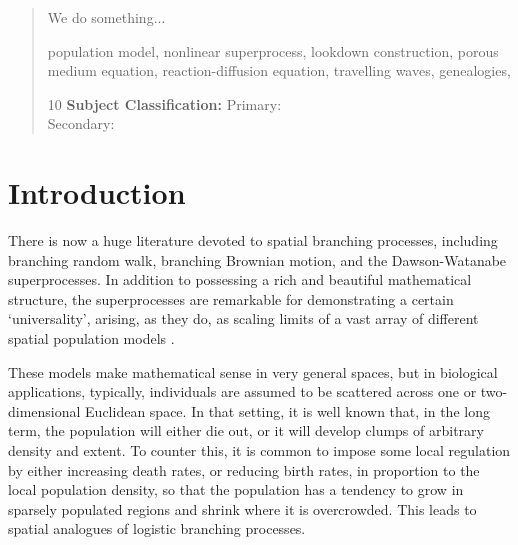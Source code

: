 \documentclass[12pt]{article}
\begin{document}
\date{\today}
\maketitle


\begin{abstract}

We do something...

\vspace{.1in}


  population model, nonlinear superprocess, 
lookdown construction, porous medium equation, 
reaction-diffusion equation, travelling waves, genealogies,


\vspace{.1in}



10 {\bf Subject Classification:}  Primary:  
\\Secondary:   %
 
\end{abstract}
\tableofcontents
\newpage



\section{Introduction}


There is now a huge literature devoted to spatial branching processes,
including branching random walk, 
branching Brownian motion, and the Dawson-Watanabe superprocesses.  
In addition to possessing a rich and beautiful mathematical structure, 
the superprocesses are remarkable for demonstrating a certain `universality', 
arising, as they do, as scaling limits of a vast array of different 
spatial population models \cite[e.g.,][]{chetwynd-diggle/etheridge:2018,
cox/perkins:2005,
cox/durrett/perkins:1999,
cox/durrett/perkins:2000,
holmes:2008,
vanderhofstad/sakai:2010,
vanderhofstad/slade:2003,
vanderhofstad/holmes/perkins:2017}.

These models make mathematical sense in very general spaces, but
in biological applications, typically, 
individuals are assumed to be scattered across one or two-dimensional
Euclidean space. In that setting, it is well known that, 
in the long term, the population will either 
die out, or it will develop clumps of arbitrary density and extent. 
To counter this, it is common to
impose some local regulation by either increasing death rates, or 
reducing birth rates, in proportion to the local population density,
so that the population has a tendency to grow in sparsely populated regions
and shrink where it is overcrowded. This leads to spatial analogues of  
logistic branching processes.
\end{document}
